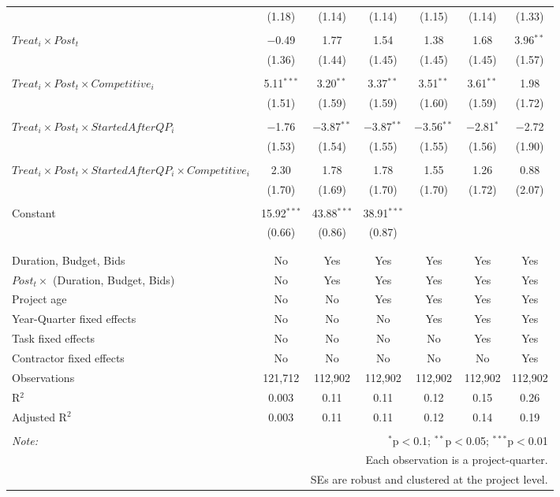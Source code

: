\documentclass[
]{article}
\begin{document}
\begin{table}[H]
\begin{tabular}{@{\extracolsep{-3pt}}lcccccc}
  & (1.18) & (1.14) & (1.14) & (1.15) & (1.14) & (1.33) \\ 
  & & & & & & \\ 
 $Treat_i \times Post_t$ & $-$0.49 & 1.77 & 1.54 & 1.38 & 1.68 & 3.96$^{**}$ \\ 
  & (1.36) & (1.44) & (1.45) & (1.45) & (1.45) & (1.57) \\ 
  & & & & & & \\ 
 $Treat_i \times Post_t \times Competitive_i$ & 5.11$^{***}$ & 3.20$^{**}$ & 3.37$^{**}$ & 3.51$^{**}$ & 3.61$^{**}$ & 1.98 \\ 
  & (1.51) & (1.59) & (1.59) & (1.60) & (1.59) & (1.72) \\ 
  & & & & & & \\ 
 $Treat_i \times Post_t \times StartedAfterQP_i$ & $-$1.76 & $-$3.87$^{**}$ & $-$3.87$^{**}$ & $-$3.56$^{**}$ & $-$2.81$^{*}$ & $-$2.72 \\ 
  & (1.53) & (1.54) & (1.55) & (1.55) & (1.56) & (1.90) \\ 
  & & & & & & \\ 
 $Treat_i \times Post_t \times StartedAfterQP_i \times Competitive_i$ & 2.30 & 1.78 & 1.78 & 1.55 & 1.26 & 0.88 \\ 
  & (1.70) & (1.69) & (1.70) & (1.70) & (1.72) & (2.07) \\ 
  & & & & & & \\ 
 Constant & 15.92$^{***}$ & 43.88$^{***}$ & 38.91$^{***}$ &  &  &  \\ 
  & (0.66) & (0.86) & (0.87) &  &  &  \\ 
  & & & & & & \\ 
\hline \\[-1.8ex] 
Duration, Budget, Bids & No & Yes & Yes & Yes & Yes & Yes \\ 
$Post_t \times $  (Duration, Budget, Bids) & No & Yes & Yes & Yes & Yes & Yes \\ 
Project age & No & No & Yes & Yes & Yes & Yes \\ 
Year-Quarter fixed effects & No & No & No & Yes & Yes & Yes \\ 
Task fixed effects & No & No & No & No & Yes & Yes \\ 
Contractor fixed effects & No & No & No & No & No & Yes \\ 
Observations & 121,712 & 112,902 & 112,902 & 112,902 & 112,902 & 112,902 \\ 
R$^{2}$ & 0.003 & 0.11 & 0.11 & 0.12 & 0.15 & 0.26 \\ 
Adjusted R$^{2}$ & 0.003 & 0.11 & 0.11 & 0.12 & 0.14 & 0.19 \\ 
\hline 
\hline \\[-1.8ex] 
\textit{Note:}  & \multicolumn{6}{r}{$^{*}$p$<$0.1; $^{**}$p$<$0.05; $^{***}$p$<$0.01} \\ 
 & \multicolumn{6}{r}{Each observation is a project-quarter.} \\ 
 & \multicolumn{6}{r}{SEs are robust and clustered at the project level.} \\ 
\end{tabular} 
\end{table}
\end{document}
